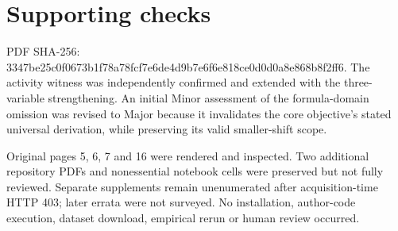 \documentclass[10pt]{article}
\begin{document}
\section*{Supporting checks}
PDF SHA-256: 3347be25c0f0673b1f78a78fcf7e6de4d9b7e6f6e818ce0d0d0a8e868b8f2ff6. The activity witness was independently confirmed and extended with the three-variable strengthening. An initial Minor assessment of the formula-domain omission was revised to Major because it invalidates the core objective’s stated universal derivation, while preserving its valid smaller-shift scope.\par
Original pages 5, 6, 7 and 16 were rendered and inspected. Two additional repository PDFs and nonessential notebook cells were preserved but not fully reviewed. Separate supplements remain unenumerated after acquisition-time HTTP 403; later errata were not surveyed. No installation, author-code execution, dataset download, empirical rerun or human review occurred.\par
\end{document}
